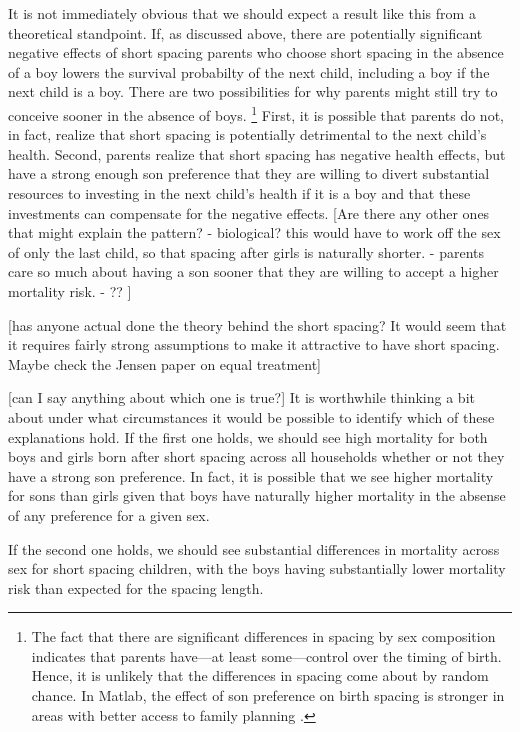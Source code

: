 It is not immediately obvious that we should expect a result like this from a theoretical
standpoint.
If, as discussed above, there are potentially significant negative effects of short spacing
parents who choose short spacing in the absence of a boy lowers the survival probabilty of
the next child, including a boy if the next child is a boy.
There are two possibilities for why parents might still try to conceive sooner in the 
absence of boys.%
\footnote{
The fact that there are significant differences in spacing by sex composition indicates that
parents have---at least some---control over the timing of birth.
Hence, it is unlikely that the differences in spacing come about by random chance.
In Matlab, the effect of son preference on birth spacing is stronger in areas with better 
access to family planning \citep{Rahman1993}.
}
First, it is possible that parents do not, in fact, realize that short spacing is potentially
detrimental to the next child's health.
Second, parents realize that short spacing has negative health effects, but have a strong
enough son preference that they are willing to divert substantial resources to investing
in the next child's health if it is a boy and that these investments can compensate for 
the negative effects.
[Are there any other ones that might explain the pattern?
    - biological? this would have to work off the sex of only the last child, so that
    spacing after girls is naturally shorter.
    - parents care so much about having a son sooner that they are willing to accept a 
    higher mortality risk.
    - ??
    ]

[has anyone actual done the theory behind the short spacing?
It would seem that it requires fairly strong assumptions to make it attractive to
have short spacing.
Maybe check the Jensen paper on equal treatment]

[can I say anything about which one is true?]
It is worthwhile thinking a bit about under what circumstances it would be possible to
identify which of these explanations hold.
If the first one holds, we should see high mortality for both boys and girls born
after short spacing across all households whether or not they have a strong son preference.
In fact, it is possible that we see higher mortality for sons than girls given that boys 
have naturally higher mortality in the absense of any preference for a given sex.

If the second one holds, we should see substantial differences in mortality across
sex for short spacing children, with the boys having substantially lower mortality risk
than expected for the spacing length.

